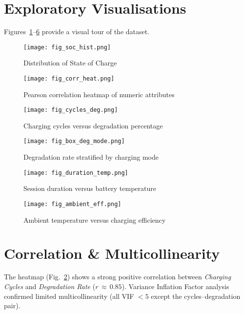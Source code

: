 \documentclass[11pt,a4paper]{article}
\begin{document}
\section{Exploratory Visualisations}
Figures~\ref{fig:soc}--\ref{fig:ambient} provide a visual tour of the dataset.

\begin{figure}[h]
 \centering
 \texttt{[image: fig\_soc\_hist.png]}
 \caption{Distribution of State of Charge}
 \label{fig:soc}
\end{figure}

\begin{figure}[h]
 \centering
 \texttt{[image: fig\_corr\_heat.png]}
 \caption{Pearson correlation heatmap of numeric attributes}
 \label{fig:heat}
\end{figure}

\begin{figure}[h]
 \centering
 \texttt{[image: fig\_cycles\_deg.png]}
 \caption{Charging cycles versus degradation percentage}
 \label{fig:cycles}
\end{figure}

\begin{figure}[h]
 \centering
 \texttt{[image: fig\_box\_deg\_mode.png]}
 \caption{Degradation rate stratified by charging mode}
 \label{fig:mode}
\end{figure}

\begin{figure}[h]
 \centering
 \texttt{[image: fig\_duration\_temp.png]}
 \caption{Session duration versus battery temperature}
 \label{fig:duration}
\end{figure}

\begin{figure}[h]
 \centering
 \texttt{[image: fig\_ambient\_eff.png]}
 \caption{Ambient temperature versus charging efficiency}
 \label{fig:ambient}
\end{figure}

\clearpage
\section{Correlation \& Multicollinearity}
The heatmap (Fig.~\ref{fig:heat}) shows a strong positive correlation between \textit{Charging Cycles} and \textit{Degradation Rate} ($r\,\approx\,0.85$).  
Variance Inflation Factor analysis confirmed limited multicollinearity (all VIF $<5$ except the cycles--degradation pair).
\end{document}
